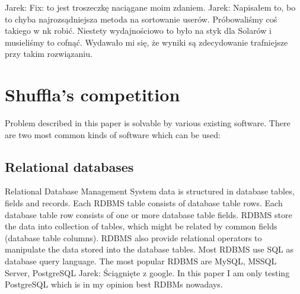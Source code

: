 \documentclass[10pt,a4paper]{article}
\newcommand{\jarek}[1]{\noindent\colorbox{myYellow}{Jarek: #1}}
\begin{document}
\jarek{Fix: to jest troszeczkę naciągane moim zdaniem.}
\jarek{Napisałem to, bo to chyba najrozsądniejsza metoda na sortowanie userów. Próbowaliśmy coś takiego w nk robić. Niestety wydajnościowo to było na styk dla Solarów i musieliśmy to cofnąć. Wydawało mi się, że wyniki są zdecydowanie trafniejsze przy takim rozwiązaniu. }

\section{Shuffla's competition}
Problem described in this paper is solvable by various existing software. There are two most common kinds of software which can be used:

\subsection{Relational databases}
Relational Database Management System data is structured in database tables, fields and records. Each RDBMS table consists of database table rows. Each database table row consists of one or more database table fields. RDBMS store the data into collection of tables, which might be related by common fields (database table columns). RDBMS also provide relational operators to manipulate the data stored into the database tables. Most RDBMS use SQL as database query language. The most popular RDBMS are MySQL, MSSQL Server, PostgreSQL \jarek{Ściągnięte z google}. In this paper I am only testing PostgreSQL which is in my opinion best RDBMs nowadays.
\end{document}
